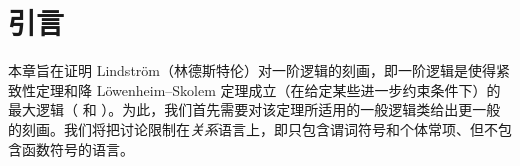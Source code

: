 \documentclass[../../../include/open-logic-section]{subfiles}
\begin{document}
\section{引言}

本章旨在证明 Lindstr\"om（林德斯特伦）对一阶逻辑的刻画，即一阶逻辑是使得紧致性定理和降 Löwenheim--Skolem 定理成立（在给定某些进一步约束条件下）的最大逻辑（ 和 ）。为此，我们首先需要对该定理所适用的一般逻辑类给出更一般的刻画。我们将把讨论限制在\emph{关系}语言上，即只包含谓词符号和个体常项、但不包含函数符号的语言。
\end{document}
